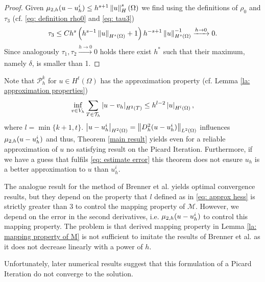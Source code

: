\begin{proof}
	Given $\mu_{2,h}(u-u_h^i) \leq h^{s+1} \left\lVert u \right\rVert_H^s(\Omega)$ we find using the definitions of $\rho_0$ and $\tau_3$ (cf. \eqref{eq: definition rho0} and \eqref{eq: tau3})
	\begin{align*}
		\tau_3  \leq C h^{s} \left(h^{s-1} \left\lVert u \right\rVert_{H^s(\Omega)}+1\right) h^{-s+1} \left\lVert u \right\rVert_{H^{s}(\Omega)}^{-1} \xrightarrow{h \rightarrow 0}  0.
	\end{align*}
	Since analogously $\tau_1, \tau_2 \xrightarrow[]{h\rightarrow 0} 0$ holds there exist $h^*$ such that their maximum, namely $\delta$, is smaller than 1.
\end{proof}
	
Note that $\mathcal P^k_h$ for $u \in H^t(\Omega)$ has the approximation property  (cf. Lemma \ref{la: approximation properties})
\begin{align}
	\inf_{v \in V_h} \sum_{T \in \mathcal{T}_h} \left| u-v_h \right|_{H^2(T)} \leq h^{l-2} \left| u \right|_{H^l(\Omega)}, \label{eq: approx hess}
\end{align}
where $l = \min\{k+1,t\}$. $\left| u-u^i_h \right|_{H^2(\Omega)} = \left\lVert D_h^2 (u-u^i_h) \right\rVert_{L^2(\Omega)}$ influences $\mu_{2,h}(u-u^i_h)$ and thus, Theorem \ref{main result} yields even for a reliable approximation of $u$ no satisfying result on the Picard Iteration. Furthermore, if we have a guess that fulfils \eqref{eq: estimate error} this theorem does not ensure $u_h$ is a better approximation to $u$ than $u^i_h$. 

The analogue result for the method of Brenner et al. \cite[Theorem 3.1]{BGN+2011} yields optimal convergence results, but they depend on the property that $l$ defined as in \eqref{eq: approx hess} is strictly greater than $3$ to control the mapping property of $\mathcal M$. However, we depend on the error in the second derivatives, i.e. $\mu_{2,h}(u-u_h^i)$ to control this mapping property. The problem is that derived mapping property in Lemma \ref{la: mapping property of M} is not sufficient to imitate the results of Brenner et al. as it does not decrease linearly with a power of $h$.

Unfortunately, later numerical results suggest that this formulation of a Picard Iteration do not converge to the \MA solution.	
	
